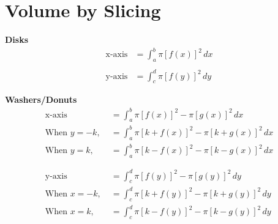 \section{Volume by Slicing}

\begin{framed}
  \noindent \textbf{Disks}
  \begin{align*}
    \text{x-axis} &= \int_a^b \pi [f(x)]^2 \, dx\\\\
    \text{y-axis} &= \int_c^d \pi [f(y)]^2 \, dy
  \end{align*}
\end{framed}

\begin{framed}
  \noindent \textbf{Washers/Donuts}
  \begin{align*}
    \text{x-axis} &= \int_a^b \pi [f(x)]^2 - \pi [g(x)]^2 \, dx\\
    \text{When } y=-k, \; &= \int_a^b \pi [k+f(x)]^2 - \pi [k+g(x)]^2 \, dx\\
    \text{When } y=k, \; &= \int_a^b \pi [k-f(x)]^2 - \pi [k-g(x)]^2 \, dx\\\\\\
    \text{y-axis} &= \int_c^d \pi [f(y)]^2 - \pi [g(y)]^2 \, dy\\
    \text{When } x=-k, \; &= \int_c^d \pi [k+f(y)]^2 - \pi [k+g(y)]^2 \, dy\\
    \text{When } x=k, \; &= \int_c^d \pi [k-f(y)]^2 - \pi [k-g(y)]^2 \, dy
  \end{align*}
\end{framed}